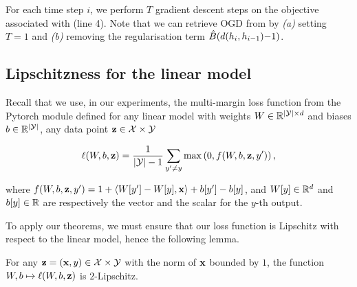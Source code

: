 \begin{noaddcontents}
    For each time step $i$, we perform $T$ gradient descent steps on the objective associated with  (line 4).
    Note that we can retrieve OGD from  by {\it (a)} setting $T=1$ and {\it (b)} removing the regularisation term $\hat{B}(d(h_i, h_{i-1}){-}1)$.
    
    \subsection{Lipschitzness for the linear model}
    \label{sec:lip-linear}
    
    Recall that we use, in our experiments, the multi-margin loss function from the Pytorch module defined for any linear model with weights $W\in\mathbb{R}^{|\mathcal{Y}|\times d}$ and biases $b\in\mathbb{R}^{|\mathcal{Y}|}$, any data point $\mathbf{z}\in \mathcal{X}\times\mathcal{Y}$
    
    \[\ell(W,b,\mathbf{z})= \frac{1}{|\mathcal{Y}|-1}\sum_{y^\prime \neq y} \max\left(0, f(W,b,\mathbf{z},y') \right), \]
    
    where $f(W,b,\mathbf{z},y')= 1+ \langle W[y']-W[y],\mathbf{x} \rangle+b[y']-b[y]$, and $W[y]\in \mathbb{R}^{d}$ and $b[y]\in\mathbb{R}$ are respectively the vector and the scalar for the $y$-th output.
    
    To apply our theorems, we must ensure that our loss function is Lipschitz with respect to the linear model, hence the following lemma.
    
    \begin{lemma}\label{lemma:lipschitz-linear}
        For any $\mathbf{z}=(\mathbf{x},y)\in\mathcal{X}\times\mathcal{Y}$ with the norm of $\mathbf{x}$ bounded by $1$, the function $W,b\mapsto \ell(W,b,\mathbf{z})$ is $2$-Lipschitz.
    \end{lemma}
    

\end{noaddcontents}
